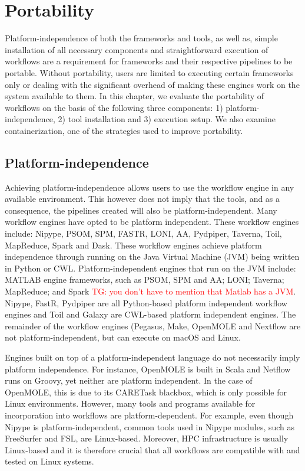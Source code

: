 \documentclass{report}
\newcommand{\tristan}[1]{\textcolor{red}{TG: #1}}
\begin{document}
    \chapter{Portability}\label{portability}
        Platform-independence of both 
        the frameworks and tools, as well as, simple installation of all 
        necessary components and straightforward execution of workflows are a 
        requirement for frameworks and their respective pipelines to be 
        portable. Without portability, users are limited to executing certain
        frameworks only or dealing with the significant overhead of making 
        these engines work on the system available to them. In this chapter, 
        we evaluate the portability of workflows on the basis of the following
        three components: 1) platform-independence, 2) tool installation and
        3) execution setup. We also examine containerization, one of the 
        strategies used to improve portability.

        \section{Platform-independence}
            Achieving platform-independence allows users to use the workflow 
            engine in any available environment. This however does not imply 
            that the tools, and as a consequence, the pipelines created will
            also be platform-independent. Many workflow engines have opted to 
            be platform independent. These workflow engines include: Nipype,
            PSOM, SPM, FASTR, LONI, AA, Pydpiper, Taverna, Toil, MapReduce, Spark and
            Dask. These workflow engines achieve platform independence through
            running on the Java Virtual Machine (JVM) being written in 
            Python or CWL. Platform-independent engines that run on the JVM include: 
            MATLAB engine frameworks, such as PSOM, SPM and AA; LONI; Taverna; 
            MapReduce; and Spark \tristan{you don't have to mention that Matlab has a JVM}. Nipype, FastR, Pydpiper are all Python-based platform 
            independent workflow engines and Toil and Galaxy are CWL-based 
            platform independent engines. 
            The remainder of the 
            workflow engines (Pegasus, Make, OpenMOLE and Nextflow are 
            not platform-independent, but can execute on macOS and Linux.

            Engines built on top of a platform-independent language do not 
            necessarily imply platform independence. For instance, OpenMOLE is 
            built in Scala and Netflow runs on Groovy, yet neither are platform
            independent. In the case of OpenMOLE, this is due to its CARETask
            blackbox, which is only possible for Linux environments. However,
            many tools and programs available for incorporation into workflows
            are platform-dependent. For example, even though Nipype is 
            platform-independent, common tools used in Nipype modules, such as 
            FreeSurfer and FSL, are Linux-based. Moreover, HPC infrastructure 
            is usually Linux-based and it is therefore crucial that all 
            workflows are compatible with and tested on Linux systems.
             
\end{document}
